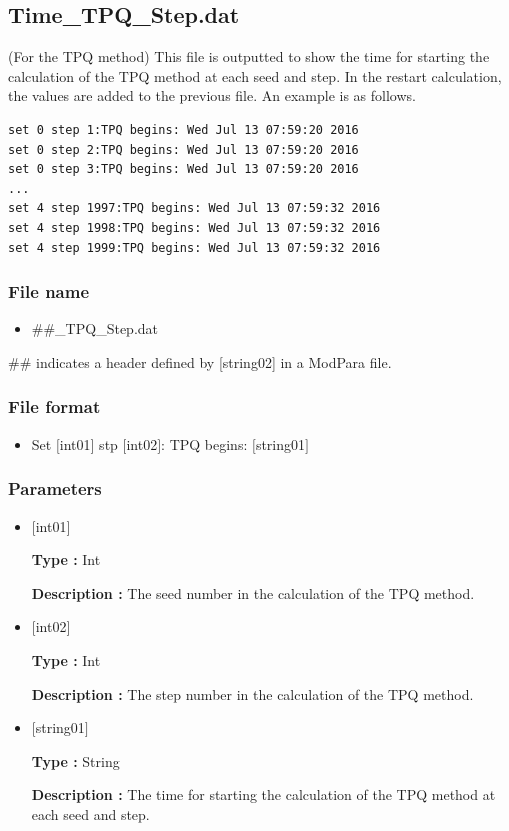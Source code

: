 \newpage
\subsection{Time\_TPQ\_Step.dat}
(For the TPQ method) This file is outputted to show the time for starting the calculation of the TPQ method at each seed and step. 
In the restart calculation, the values are added to the previous file.
An example is as follows.\\
\begin{minipage}{15cm}
\begin{screen}
\begin{verbatim}
set 0 step 1:TPQ begins: Wed Jul 13 07:59:20 2016
set 0 step 2:TPQ begins: Wed Jul 13 07:59:20 2016
set 0 step 3:TPQ begins: Wed Jul 13 07:59:20 2016
...
set 4 step 1997:TPQ begins: Wed Jul 13 07:59:32 2016
set 4 step 1998:TPQ begins: Wed Jul 13 07:59:32 2016
set 4 step 1999:TPQ begins: Wed Jul 13 07:59:32 2016
\end{verbatim}
\end{screen}
\end{minipage}

\subsubsection{File name}
 \begin{itemize}
   \item  \#\#\_TPQ\_Step.dat
  \end{itemize}
  \#\# indicates a header defined by [string02] in a ModPara file.

\subsubsection{File format}
 \begin{itemize}
   \item Set $[$int01$]$ stp $[$int02$]$: TPQ begins: $[$string01$]$
  \end{itemize}
\subsubsection{Parameters}
 \begin{itemize}

  \item  $[$int01$]$
  
 {\bf Type :} Int

{\bf Description :} The seed number in the calculation of the TPQ method.
 
  \item  $[$int02$]$
  
 {\bf Type :} Int

{\bf Description :} The step number in the calculation of the TPQ method.

  \item  $[$string01$]$
  
 {\bf Type :} String

{\bf Description :} The time for starting the calculation of the TPQ method at each seed and step.

 \end{itemize}


